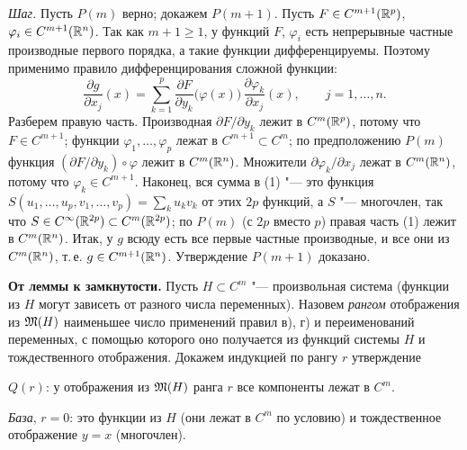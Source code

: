\begin{solution}[1 (\S\,5)]
\emph{Шаг.} Пусть $P(m)$ верно; докажем $P(m+1)$. Пусть $F\in C^{m+1}(\mathbb R^p)$,
$\varphi_i\in C^{m+1}(\mathbb R^n)$. Так как $m+1\ge1$, у функций $F$, $\varphi_i$
есть непрерывные частные производные первого порядка, а такие функции
дифференцируемы. Поэтому применимо правило дифференцирования сложной
функции:
\begin{equation*}\tag{1}
\frac{\partial g}{\partial x_j}(x)=\sum_{k=1}^{p}\frac{\partial F}{\partial y_k}\bigl(\varphi(x)\bigr)\,
\frac{\partial\varphi_k}{\partial x_j}(x),\qquad j=1,\dots,n .
\end{equation*}
Разберем правую часть. Производная $\partial F/\partial y_k$ лежит
в $C^m(\mathbb R^p)$, потому что $F\in C^{m+1}$; функции $\varphi_1,\dots,\varphi_p$
лежат в $C^{m+1}\subset C^m$; по предположению $P(m)$ функция
$(\partial F/\partial y_k)\circ\varphi$ лежит в $C^m(\mathbb R^n)$. Множители
$\partial\varphi_k/\partial x_j$ лежат в $C^m(\mathbb R^n)$, потому что
$\varphi_k\in C^{m+1}$. Наконец, вся сумма в (1) "--- это функция
$S(u_1,\dots,u_p,v_1,\dots,v_p)=\sum_ku_kv_k$ от этих $2p$ функций, а $S$
"--- многочлен, так что $S\in C^\infty(\mathbb R^{2p})\subset C^m(\mathbb R^{2p})$; по $P(m)$
(с $2p$ вместо $p$) правая часть (1) лежит в $C^m(\mathbb R^n)$. Итак, у $g$ всюду
есть все первые частные производные, и все они из $C^m(\mathbb R^n)$, т.\,е.
$g\in C^{m+1}(\mathbb R^n)$. Утверждение $P(m+1)$ доказано.

\textbf{От леммы к замкнутости.} Пусть $H\subset C^m$ "--- произвольная
система (функции из $H$ могут зависеть от разного числа переменных).
Назовем \emph{рангом} отображения из $\mathfrak M(H)$ наименьшее число применений
правил в), г) и переименований переменных, с помощью которого оно
получается из функций системы $H$ и тождественного отображения. Докажем
индукцией по рангу $r$ утверждение
\begin{keystmt}
$Q(r)$: у отображения из $\mathfrak M(H)$ ранга $r$ все компоненты лежат в $C^m$.
\end{keystmt}
\emph{База}, $r=0$: это функции из $H$ (они лежат в $C^m$ по условию)
и тождественное отображение $y=x$ (многочлен).


\end{solution}
